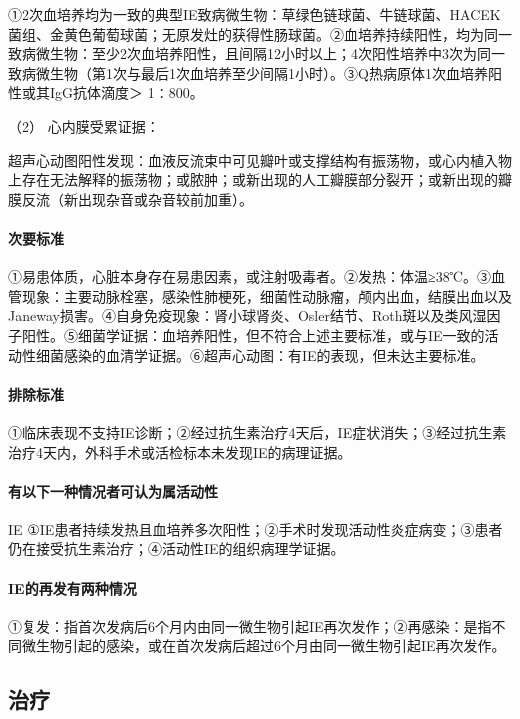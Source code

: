 ①2次血培养均为一致的典型IE致病微生物：草绿色链球菌、牛链球菌、HACEK菌组、金黄色葡萄球菌；无原发灶的获得性肠球菌。②血培养持续阳性，均为同一致病微生物：至少2次血培养阳性，且间隔12小时以上；4次阳性培养中3次为同一致病微生物（第1次与最后1次血培养至少间隔1小时）。③Q热病原体1次血培养阳性或其IgG抗体滴度＞
1∶800。

\hypertarget{text00300.htmlux5cux23CHP10-3-2-4-1-2}{}
（2） 心内膜受累证据：

超声心动图阳性发现：血液反流束中可见瓣叶或支撑结构有振荡物，或心内植入物上存在无法解释的振荡物；或脓肿；或新出现的人工瓣膜部分裂开；或新出现的瓣膜反流（新出现杂音或杂音较前加重）。

\paragraph{次要标准}

①易患体质，心脏本身存在易患因素，或注射吸毒者。②发热：体温≥38℃。③血管现象：主要动脉栓塞，感染性肺梗死，细菌性动脉瘤，颅内出血，结膜出血以及Janeway损害。④自身免疫现象：肾小球肾炎、Osler结节、Roth斑以及类风湿因子阳性。⑤细菌学证据：血培养阳性，但不符合上述主要标准，或与IE一致的活动性细菌感染的血清学证据。⑥超声心动图：有IE的表现，但未达主要标准。

\paragraph{排除标准}

①临床表现不支持IE诊断；②经过抗生素治疗4天后，IE症状消失；③经过抗生素治疗4天内，外科手术或活检标本未发现IE的病理证据。

\paragraph{有以下一种情况者可认为属活动性}

IE
①IE患者持续发热且血培养多次阳性；②手术时发现活动性炎症病变；③患者仍在接受抗生素治疗；④活动性IE的组织病理学证据。

\paragraph{IE的再发有两种情况}

①复发：指首次发病后6个月内由同一微生物引起IE再次发作；②再感染：是指不同微生物引起的感染，或在首次发病后超过6个月由同一微生物引起IE再次发作。

\subsection{治疗}

